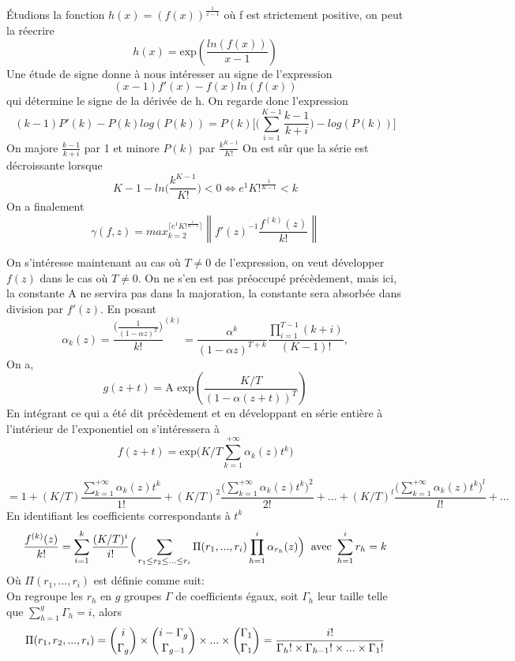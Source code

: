 \documentclass[a4paper,10.5pt]{article}
\begin{document}
	
	\noindent Étudions la fonction $h(x)=(f(x))^{\frac{1}{x-1}}$ où f est strictement positive, on peut la réecrire
	\[h(x)=\text{exp}(\frac{ln(f(x))}{x-1}) \]
	Une étude de signe donne à nous intéresser au signe de l'expression
	\[(x-1)f'(x)-f(x)ln(f(x)) \tag{1}\] 
	qui détermine le signe de la dérivée de h. On regarde donc l'expression 
	\[(k-1)P'(k)-P(k)log(P(k))=P(k)\Big[\big(\sum_{i=1}^{K-1}\frac{k-1}{k+i}\big)-log(P(k))\Big]\]
	On majore $\frac{k-1}{k+i}$ par 1 et minore $P(k)$ par $\frac{k^{K-1}}{K!}$ On est sûr que la série est décroissante lorsque 
	\[K-1-ln\big(\frac{k^{K-1}}{K!}\big)<0 \Longleftrightarrow e^{1}K!^{\frac{1}{K-1}}< k\]
	On a finalement 
	\[\gamma(f,z)=max_{k=2}^{\lceil e^{1}K!^{\frac{1}{K-1}} \rceil}\left\|f'(z)^{-1}\frac{f^{(k)}(z)}{k!}\right\| \]
	
	\vspace{1cm} 
	
	On s'intéresse maintenant au cas où $T\neq 0$ de l'expression, on veut développer $f(z)$ dans le cas où $T \neq 0$. On ne s'en est pas préoccupé précèdement, mais ici, la constante A ne servira pas dans la majoration, la constante sera absorbée dans division par $f'(z)$. En posant \[\alpha_{k}(z)=\frac{\big(\frac{1}{(1-\alpha z)^{T}}\big)}{k!}^{(k)}=\frac{\alpha^{k}}{(1-\alpha z)^{T+k}} \frac{\prod_{i=1}^{T-1}(k+i)}{(K-1)!},\] On a,
	\[g(z+t)=\text{A exp}(\frac{K/T}{(1-\alpha (z+t))^{T}})\]
	En intégrant ce qui a été dit précèdement et en développant en série entière à l'intérieur de l'exponentiel on s'intéressera à
	\[f(z+t)=\text{exp}\Big(K/T \sum_{k=1}^{+\infty}\alpha_{k}(z)t^{k} \Big)\]
	
	\[= 1+(K/T)\frac{\sum_{k=1}^{+\infty}\alpha_{k}(z)t^{k}}{1!}+(K/T)^{2}\frac{\big(\sum_{k=1}^{+\infty}\alpha_{k}(z)t^{k}\big)^{2}}{2!}+...+(K/T)^{l}\frac{\big(\sum_{k=1}^{+\infty}\alpha_{k}(z)t^{k}\big)^{l}}{l!}+...\]
	En identifiant les coefficients correspondants à $t^{k}$
	\[\frac{f^{(k)}(z)}{k!}=\sum_{i=1}^{k}\frac{(K/T)^{i}}{i!}\Big(\sum_{r_{1}\leq r_{2}\leq ...\leq{r_{i}}}\Pi(r_{1},...,r_{i})\prod_{h=1}^{i}\alpha_{r_{h}}(z) \Big) \hspace{2mm} \text{avec }\sum_{h=1}^{i} r_{h}=k\]
	Où $\Pi(r_{1},...,r_{i})$ est définie comme suit:\\
	On regroupe les $r_{h}$ en $g$ groupes $\Gamma$ de coefficients égaux, soit $\Gamma_{h}$ leur taille telle que $\sum_{h=1}^{g}\Gamma_{h}=i$, alors
	\[\Pi(r_{1},r_{2},...,r_{i})=\dbinom{i}{\Gamma_{g}}\times \dbinom{i-\Gamma_{g}}{\Gamma_{g-1}}\times ...\times \dbinom{\Gamma_{1}}{\Gamma_{1}}=\frac{i!}{\Gamma_h! \times \Gamma_{h-1}! \times ... \times \Gamma_1!}\]
	
\end{document}
